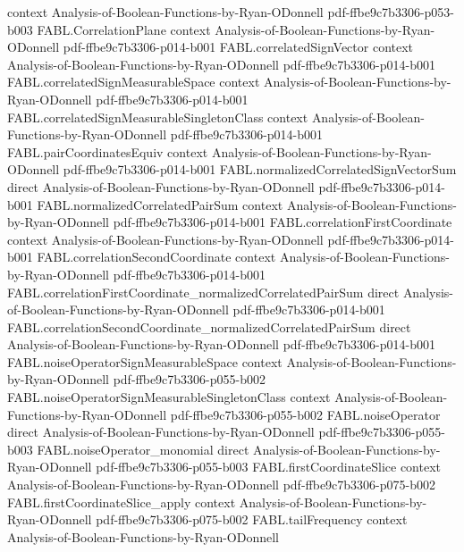 \begin{theorem}
  {context}
  {Analysis-of-Boolean-Functions-by-Ryan-ODonnell}
  {pdf-ffbe9c7b3306-p053-b003}
\proofstep
  {FABL.CorrelationPlane}
  {context}
  {Analysis-of-Boolean-Functions-by-Ryan-ODonnell}
  {pdf-ffbe9c7b3306-p014-b001}
\proofstep
  {FABL.correlatedSignVector}
  {context}
  {Analysis-of-Boolean-Functions-by-Ryan-ODonnell}
  {pdf-ffbe9c7b3306-p014-b001}
\proofstep
  {FABL.correlatedSignMeasurableSpace}
  {context}
  {Analysis-of-Boolean-Functions-by-Ryan-ODonnell}
  {pdf-ffbe9c7b3306-p014-b001}
\proofstep
  {FABL.correlatedSignMeasurableSingletonClass}
  {context}
  {Analysis-of-Boolean-Functions-by-Ryan-ODonnell}
  {pdf-ffbe9c7b3306-p014-b001}
\proofstep
  {FABL.pairCoordinatesEquiv}
  {context}
  {Analysis-of-Boolean-Functions-by-Ryan-ODonnell}
  {pdf-ffbe9c7b3306-p014-b001}
\proofstep
  {FABL.normalizedCorrelatedSignVectorSum}
  {direct}
  {Analysis-of-Boolean-Functions-by-Ryan-ODonnell}
  {pdf-ffbe9c7b3306-p014-b001}
\proofstep
  {FABL.normalizedCorrelatedPairSum}
  {context}
  {Analysis-of-Boolean-Functions-by-Ryan-ODonnell}
  {pdf-ffbe9c7b3306-p014-b001}
\proofstep
  {FABL.correlationFirstCoordinate}
  {context}
  {Analysis-of-Boolean-Functions-by-Ryan-ODonnell}
  {pdf-ffbe9c7b3306-p014-b001}
\proofstep
  {FABL.correlationSecondCoordinate}
  {context}
  {Analysis-of-Boolean-Functions-by-Ryan-ODonnell}
  {pdf-ffbe9c7b3306-p014-b001}
\proofstep
  {FABL.correlationFirstCoordinate_normalizedCorrelatedPairSum}
  {direct}
  {Analysis-of-Boolean-Functions-by-Ryan-ODonnell}
  {pdf-ffbe9c7b3306-p014-b001}
\proofstep
  {FABL.correlationSecondCoordinate_normalizedCorrelatedPairSum}
  {direct}
  {Analysis-of-Boolean-Functions-by-Ryan-ODonnell}
  {pdf-ffbe9c7b3306-p014-b001}
\proofstep
  {FABL.noiseOperatorSignMeasurableSpace}
  {context}
  {Analysis-of-Boolean-Functions-by-Ryan-ODonnell}
  {pdf-ffbe9c7b3306-p055-b002}
\proofstep
  {FABL.noiseOperatorSignMeasurableSingletonClass}
  {context}
  {Analysis-of-Boolean-Functions-by-Ryan-ODonnell}
  {pdf-ffbe9c7b3306-p055-b002}
\proofstep
  {FABL.noiseOperator}
  {direct}
  {Analysis-of-Boolean-Functions-by-Ryan-ODonnell}
  {pdf-ffbe9c7b3306-p055-b003}
\proofstep
  {FABL.noiseOperator_monomial}
  {direct}
  {Analysis-of-Boolean-Functions-by-Ryan-ODonnell}
  {pdf-ffbe9c7b3306-p055-b003}
\proofstep
  {FABL.firstCoordinateSlice}
  {context}
  {Analysis-of-Boolean-Functions-by-Ryan-ODonnell}
  {pdf-ffbe9c7b3306-p075-b002}
\proofstep
  {FABL.firstCoordinateSlice_apply}
  {context}
  {Analysis-of-Boolean-Functions-by-Ryan-ODonnell}
  {pdf-ffbe9c7b3306-p075-b002}
\proofstep
  {FABL.tailFrequency}
  {context}
  {Analysis-of-Boolean-Functions-by-Ryan-ODonnell}

\end{theorem}
